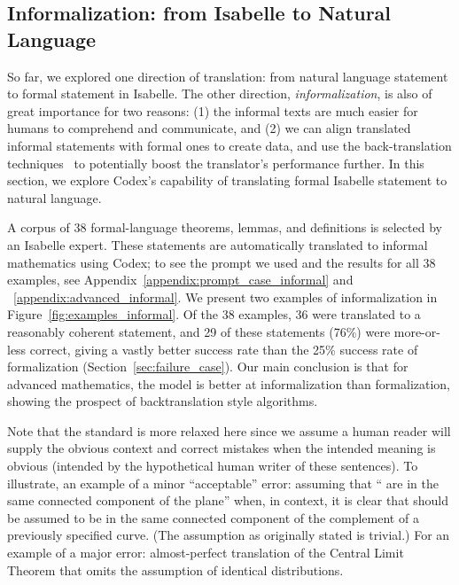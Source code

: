 \documentclass{article}
\begin{document}
\subsection{Informalization: from Isabelle to Natural Language}

So far, we explored one direction of translation: from natural language statement to formal statement in Isabelle. The other direction, \emph{informalization}, is also of great importance for two reasons: (1) the informal texts are much easier for humans to comprehend and communicate, and (2) we can align translated informal statements with formal ones to create data, and use the back-translation techniques~\citep{DBLP:conf/acl/SennrichHB16} to potentially boost the translator's performance further. In this section, we explore Codex's capability of translating formal Isabelle statement to natural language. 

A corpus of 38 formal-language theorems, lemmas, and definitions is selected by an Isabelle expert. These statements are automatically translated to informal mathematics using Codex; to
see the prompt we used and the results for all 38 examples, see Appendix~\ref{appendix:prompt_case_informal} and ~\ref{appendix:advanced_informal}. We present two examples of informalization in Figure~\ref{fig:examples_informal}. Of the 38 examples, 36 were translated to a reasonably coherent statement, and 29 of these statements (76\%) were more-or-less correct, giving a vastly better success rate than the 25\% success rate of formalization (Section~\ref{sec:failure_case}). Our main conclusion is that for advanced mathematics, the model is better at informalization than formalization, showing the prospect of backtranslation style algorithms.


Note that the standard is more relaxed here since we assume a human reader will supply the obvious context and correct mistakes when the intended meaning is obvious (intended by the hypothetical human writer of these sentences). To illustrate, an example of a minor ``acceptable'' error: assuming that `` are in the same connected component of the plane'' when, in context, it is clear that  should be assumed to be in the same connected component of the complement of a previously specified curve. (The assumption as originally stated is trivial.) For an example of a major error: almost-perfect translation of the Central Limit Theorem that omits the assumption of identical distributions.
\end{document}

